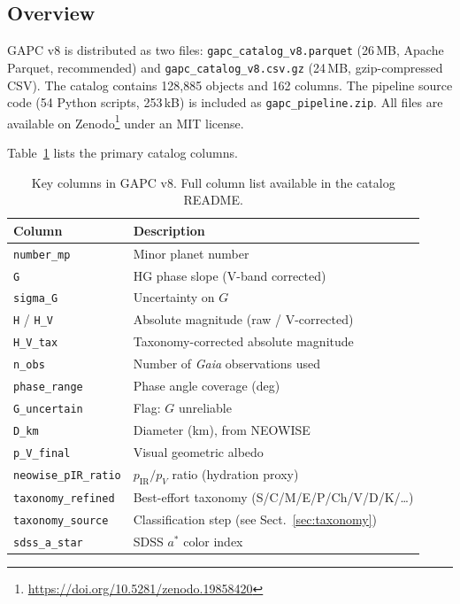 \documentclass{aa}
\newcommand{\gapc}{GAPC\xspace}
\newcommand{\gaia}{{\it Gaia}\xspace}
\begin{document}
\subsection{Overview}
\label{sec:overview}

\gapc v8 is distributed as two files: \texttt{gapc\_catalog\_v8.parquet}
(26\,MB, Apache Parquet, recommended) and \texttt{gapc\_catalog\_v8.csv.gz}
(24\,MB, gzip-compressed CSV).  The catalog contains 128,885 objects and
162 columns.  The pipeline source code (54 Python scripts, 253\,kB) is
included as \texttt{gapc\_pipeline.zip}.  All files are available on
Zenodo\footnote{\url{https://doi.org/10.5281/zenodo.19858420}} under an
MIT license.

Table~\ref{tab:columns} lists the primary catalog columns.

\begin{table}
\centering
\caption{Key columns in \gapc v8.  Full column list available in the
         catalog README.}
\label{tab:columns}
\begin{tabular}{lp{5.2cm}}
\toprule
Column & Description \\
\midrule
\texttt{number\_mp}        & Minor planet number \\
\texttt{G}                 & HG phase slope (V-band corrected) \\
\texttt{sigma\_G}          & Uncertainty on $G$ \\
\texttt{H} / \texttt{H\_V} & Absolute magnitude (raw / V-corrected) \\
\texttt{H\_V\_tax}         & Taxonomy-corrected absolute magnitude \\
\texttt{n\_obs}            & Number of \gaia observations used \\
\texttt{phase\_range}      & Phase angle coverage (deg) \\
\texttt{G\_uncertain}      & Flag: $G$ unreliable \\
\texttt{D\_km}             & Diameter (km), from NEOWISE \\
\texttt{p\_V\_final}       & Visual geometric albedo \\
\texttt{neowise\_pIR\_ratio} & $p_\mathrm{IR}/p_V$ ratio (hydration proxy) \\
\texttt{taxonomy\_refined} & Best-effort taxonomy (S/C/M/E/P/Ch/V/D/K/\ldots) \\
\texttt{taxonomy\_source}  & Classification step (see Sect.~\ref{sec:taxonomy}) \\
\texttt{sdss\_a\_star}     & SDSS $a^*$ color index \\

\end{tabular}
\end{table}
\end{document}
